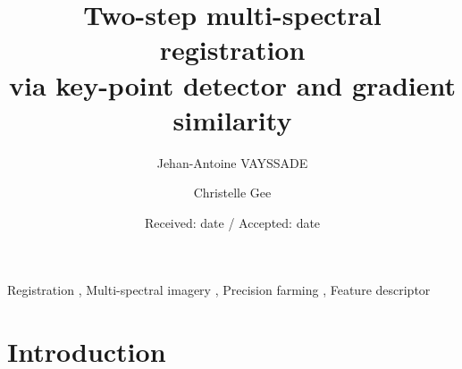 \documentclass[]{elsarticle}
\begin{document}
	\begin{keyword}
		Registration \sep
		Multi-spectral imagery \sep
		Precision farming \sep
		Feature descriptor
	\end{keyword}
	
	\begin{frontmatter}
		\title{Two-step multi-spectral registration \\ via key-point detector and gradient similarity}
		\author[unilu]{Jehan-Antoine VAYSSADE} 
		\author[unilu]{Christelle Gee} 
		\address[myuni]{Agroécologie, AgroSup Dijon, INRA, Univ. Bourgogne, Univ. Bourgogne Franche-Comté, F-21000 Dijon, France}
		\date{Received: date / Accepted: date}
	\end{frontmatter}
	
	\newpage
	
	\section{Introduction}
	
\end{document}
